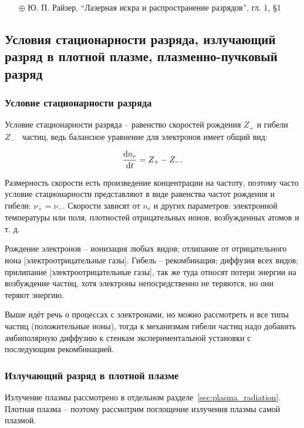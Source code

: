 \documentclass[10pt, a4paper]{article}
\begin{document}
\begin{itemize}
	\item[$\oplus$] Ю. П. Райзер, ``Лазерная искра и распространение разрядов'', гл. 1, \S 1
\end{itemize}

\subsection{Условия стационарности разряда, излучающий разряд в плотной плазме, плазменно-пучковый разряд}

\subsubsection{Условие стационарности разряда}

Условие стационарности разряда -- равенство скоростей рождения $Z_{+}$ и гибели $Z_{-}$~\cite{raizer} частиц, ведь балансное уравнение для электронов имеет общий вид:

\begin{equation*}
	\dv{n_e}{t} = Z_{+}-Z_{-}.
\end{equation*}

Размерность скорости есть произведение концентрации на частоту, поэтому часто условие стационарности представляют в виде равенства частот рождения и гибели: $\nu_{+} = \nu_{-}$. Скорости зависят от $n_e$ и других параметров: электронной
температуры или поля, плотностей отрицательных ионов, возбужденных
атомов и т. д.

Рождение электронов -- ионизация любых видов; отлипание от отрицательного иона [электроотрицательные газы]. Гибель -- рекомбинация; диффузия всех видов; прилипание [электроотрицательные газы], так же туда относят потери энергии на возбуждение частиц, хотя электроны непосредственно не теряются, но они теряют энергию. 

Выше идёт речь о процессах с электронами, но можно рассмотреть и все типы частиц (положительные ионы), тогда к механизмам гибели частиц надо добавить амбиполярную диффузию к стенкам экспериментальной установки с последующим рекомбинацией.

\subsubsection{Излучающий разряд в плотной плазме}

Излучение плазмы рассмотрено в отдельном разделе~\ref{sec:plasma_radiation}. Плотная плазма -- поэтому рассмотрим поглощение излучения плазмы самой плазмой.
\end{document}
